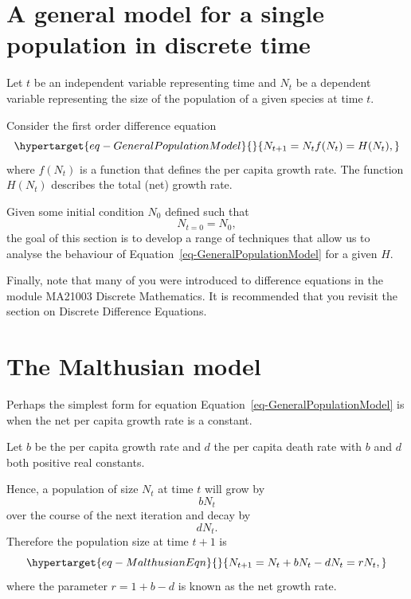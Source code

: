 \documentclass[
  letterpaper,
  DIV=11,
  numbers=noendperiod]{scrreprt}
\begin{document}
\hypertarget{a-general-model-for-a-single-population-in-discrete-time}{%
\section{A general model for a single population in discrete
time}\label{a-general-model-for-a-single-population-in-discrete-time}}

Let \(t\) be an independent variable representing time and \(N_t\) be a
dependent variable representing the size of the population of a given
species at time \(t\).

Consider the first order difference equation
\begin{equation}\protect\hypertarget{eq-GeneralPopulationModel}{}{
N_{t+1}=N_tf(N_t)=H(N_t),
}\label{eq-GeneralPopulationModel}\end{equation} where \(f(N_t)\) is a
function that defines the per capita growth rate. The function
\(H(N_t)\) describes the total (net) growth rate.

Given some initial condition \(N_0\) defined such that \[
N_{t=0}=N_0,
\] the goal of this section is to develop a range of techniques that
allow us to analyse the behaviour of
Equation~\ref{eq-GeneralPopulationModel} for a given \(H\).

Finally, note that many of you were introduced to difference equations
in the module MA21003 Discrete Mathematics. It is recommended that you
revisit the section on Discrete Difference Equations.

\hypertarget{the-malthusian-model}{%
\section{The Malthusian model}\label{the-malthusian-model}}

Perhaps the simplest form for equation
Equation~\ref{eq-GeneralPopulationModel} is when the net per capita
growth rate is a constant.

Let \(b\) be the per capita growth rate and \(d\) the per capita death
rate with \(b\) and \(d\) both positive real constants.

Hence, a population of size \(N_t\) at time \(t\) will grow by \[
bN_t
\] over the course of the next iteration and decay by\\
\[
dN_t.
\] Therefore the population size at time \(t+1\) is
\begin{equation}\protect\hypertarget{eq-MalthusianEqn}{}{
N_{t+1}=N_t + bN_t - dN_t=rN_t,
}\label{eq-MalthusianEqn}\end{equation} where the parameter \(r=1+b-d\)
is known as the net growth rate.
\end{document}
